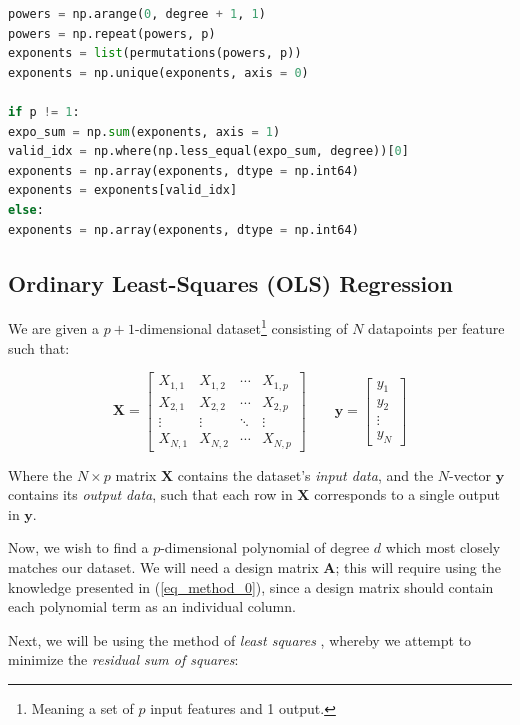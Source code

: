 \documentclass[a4paper,10pt,english]{article}
\begin{document}
\begin{lstlisting}[showstringspaces=false,language=Python,firstnumber = 1]
powers = np.arange(0, degree + 1, 1)
powers = np.repeat(powers, p)
exponents = list(permutations(powers, p))
exponents = np.unique(exponents, axis = 0)

if p != 1:
expo_sum = np.sum(exponents, axis = 1)
valid_idx = np.where(np.less_equal(expo_sum, degree))[0]
exponents = np.array(exponents, dtype = np.int64)
exponents = exponents[valid_idx]
else:
exponents = np.array(exponents, dtype = np.int64)
\end{lstlisting}


\subsection*{Ordinary Least-Squares (OLS) Regression}

We are given a $p+1$-dimensional dataset\footnote{Meaning a set of $p$ input features and 1 output.} consisting of $N$ datapoints per feature such that:

\begin{equation}
\label{eq_method_1}
\mathbf{X} = \begin{bmatrix} X_{1,1} & X_{1,2} & \cdots & X_{1,p} \\ X_{2,1} & X_{2,2} & \cdots & X_{2,p} \\ \vdots & \vdots & \ddots & \vdots \\ X_{N,1} & X_{N,2} & \cdots & X_{N,p} \end{bmatrix} \qquad \mathbf{y} = \begin{bmatrix} y_1 \\ y_2 \\ \vdots \\ y_N \end{bmatrix}
\end{equation}

Where the $N \times p$ matrix $\mathbf{X}$ contains the dataset's \textit{input data}, and the $N$-vector $\mathbf{y}$ contains its \textit{output data}, such that each row in $\mathbf{X}$ corresponds to a single output in $\mathbf{y}$.

Now, we wish to find a $p$-dimensional polynomial of degree $d$ which most closely matches our dataset. We will need a design matrix $\mathbf{A}$; this will require using the knowledge presented in (\ref{eq_method_0}), since a design matrix should contain each polynomial term as an individual column.

Next, we will be using the method of \textit{least squares} \cite{hastie_tibshirani_friedman_2013}, whereby we attempt to minimize the \textit{residual sum of squares}:
\end{document}
